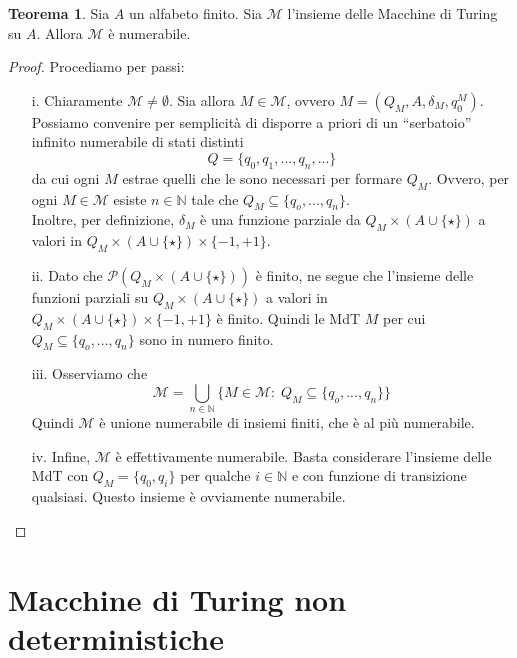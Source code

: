 \documentclass[12pt,a4paper]{report}
\theoremstyle{definition}
\newtheorem{teo}{Teorema}[section]  %
\begin{document}
\begin{teo}\label{card_mdt}
Sia $A$ un alfabeto finito. Sia $\mathcal{M}$ l'insieme delle Macchine di Turing su $A$. Allora $\mathcal{M}$ è numerabile.

\begin{proof}
Procediamo per passi:
\begin{enumerate}
\item[i.] Chiaramente $\mathcal{M} \neq \emptyset$. Sia allora $M \in \mathcal{M}$, ovvero $M=(Q_M,A,\delta_M,q_0^M)$.\\
Possiamo convenire per semplicità di disporre a priori di un ``serbatoio'' infinito numerabile di stati distinti
$$Q=\{q_0,q_1,...,q_n,...\}$$
da cui ogni $M$ estrae quelli che le sono necessari per formare $Q_M$. Ovvero, per ogni $M \in \mathcal{M}$ esiste $n \in \mathbb{N}$ tale che $Q_M \subseteq \{q_o,...,q_n\}$.\\
Inoltre, per definizione, $\delta_M$ è una funzione parziale da $Q_M \times (A \cup \{\star\})$ a valori in $Q_M \times (A \cup \{\star\}) \times \{-1,+1\}$.
\item[ii.] Dato che $\mathcal{P} (Q_M \times (A \cup \{\star\}))$ è finito, ne segue che l'insieme delle funzioni parziali su $Q_M \times (A \cup \{\star\})$ a valori in $Q_M \times (A \cup \{\star\}) \times \{-1,+1\}$ è finito. Quindi le MdT $M$ per cui $Q_M \subseteq \{q_o,...,q_n\}$ sono in numero finito.
\item[iii.] Osserviamo che
$$\mathcal{M} = \bigcup_{n \in \mathbb{N}} \big\{ M \in \mathcal{M} : \; Q_M \subseteq \{q_o,...,q_n\} \big\}$$
Quindi $\mathcal{M}$ è unione numerabile di insiemi finiti, che è al più numerabile.
\item[iv.] Infine, $\mathcal{M}$ è effettivamente numerabile. Basta considerare l'insieme delle MdT con $Q_M=\{q_0,q_i\}$ per qualche $i \in \mathbb{N}$ e con funzione di transizione qualsiasi. Questo insieme è ovviamente numerabile.
\end{enumerate}
\end{proof}
\end{teo}




\section{Macchine di Turing non deterministiche}
\end{document}
